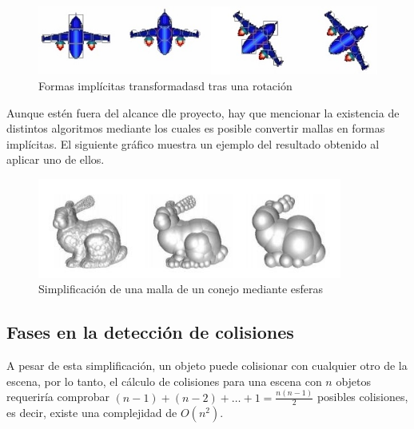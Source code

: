 \begin{figure}[!h]
	\centering	
         \includegraphics[width=12.5cm]{img/volumenesRotacion.jpg}
	\caption{Formas implícitas transformadasd tras una rotación}
\end{figure}

Aunque estén fuera del alcance dle proyecto, hay que mencionar la existencia de distintos algoritmos mediante los cuales es posible convertir mallas en formas implícitas. El siguiente gráfico muestra un ejemplo del resultado obtenido al aplicar uno de ellos.
\newline

\begin{figure}[h]
	\centering	
         \includegraphics[width=10cm]{img/BoundingVolumesSphereBunny.jpg}
	\caption{Simplificación de una malla de un conejo mediante esferas}
\end{figure}


\subsection{Fases en la detección de colisiones}

A pesar de esta simplificación, un objeto puede colisionar con cualquier otro de la escena, por lo tanto, el cálculo de colisiones para una escena con $n$ objetos requeriría comprobar $(n-1)+(n-2)+\ldots+1 = \frac{n(n-1)}{2}$ posibles colisiones, es decir, existe una complejidad de $O(n^2)$. 
\newline

